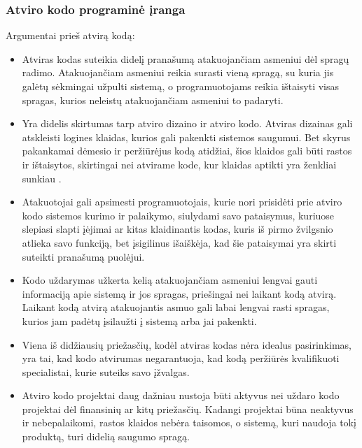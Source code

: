 \documentclass[a4paper,12pt,fleqn]{article}
\begin{document}
\subsubsection{Atviro kodo programinė įranga}
\label{sec:data}
Argumentai prieš atvirą kodą:
\begin{itemize}
	\item Atviras kodas suteikia didelį pranašumą atakuojančiam asmeniui dėl spragų radimo. Atakuojančiam asmeniui reikia surasti vieną spragą, su kuria jis galėtų sėkmingai užpulti sistemą, o programuotojams reikia ištaisyti visas spragas, kurios neleistų atakuojančiam asmeniui to padaryti\cite{brown2002opening}.
	\item Yra didelis skirtumas tarp atviro dizaino ir atviro kodo. Atviras dizainas gali atskleisti logines klaidas, kurios gali pakenkti sistemos saugumui. Bet skyrus pakankamai dėmesio ir peržiūrėjus kodą atidžiai, šios klaidos gali būti rastos ir ištaisytos, skirtingai nei atvirame kode, kur klaidas aptikti yra ženkliai sunkiau \cite{hoepman2008increased}.
	\item Atakuotojai gali apsimesti programuotojais, kurie nori prisidėti prie atviro kodo sistemos kurimo ir palaikymo, siulydami savo pataisymus, kuriuose slepiasi slapti įėjimai ar kitas klaidinantis kodas, kuris iš pirmo žvilgsnio atlieka savo funkciją, bet įsigilinus išaiškėja, kad šie pataisymai yra skirti suteikti pranašumą puolėjui\cite{951496}. 
	\item Kodo uždarymas užkerta kelią atakuojančiam asmeniui lengvai gauti informaciją apie sistemą ir jos spragas, priešingai nei laikant kodą atvirą. Laikant kodą atvirą atakuojantis asmuo gali labai lengvai rasti spragas, kurios jam padėtų įsilaužti į sistemą arba jai pakenkti\cite{hoepman2008increased}. 
	\item Viena iš didžiausių priežasčių, kodėl atviras kodas nėra idealus pasirinkimas, yra tai, kad kodo atvirumas negarantuoja, kad kodą peržiūrės kvalifikuoti specialistai, kurie suteiks savo įžvalgas\cite{951496}. 
	\item Atviro kodo projektai daug dažniau nustoja būti aktyvus nei uždaro kodo projektai dėl finansinių ar kitų priežasčių. Kadangi projektai būna neaktyvus ir nebepalaikomi, rastos klaidos nebėra taisomos, o sistemą, kuri naudoja tokį produktą, turi didelią saugumo spragą\cite{951496}. 
\end{itemize}
\end{document}
